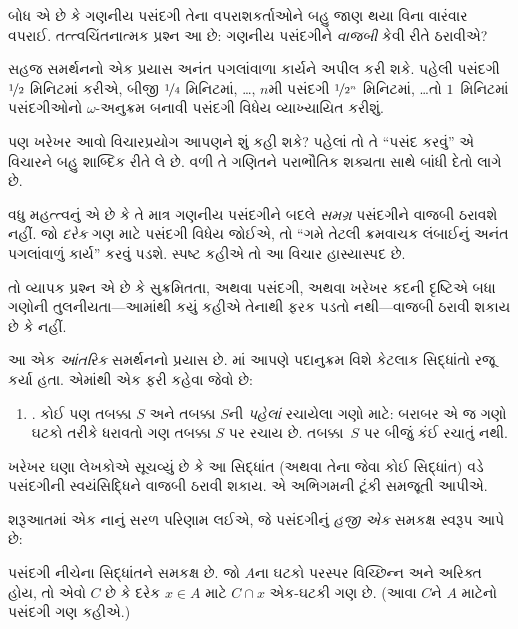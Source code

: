 બોધ એ છે કે ગણનીય પસંદગી તેના
વપરાશકર્તાઓને બહુ જાણ થયા વિના
વારંવાર વપરાઈ. તત્ત્વચિંતનાત્મક પ્રશ્ન
આ છે: ગણનીય પસંદગીને \emph{વાજબી}
કેવી રીતે ઠરાવીએ?

સહજ સમર્થનનો એક પ્રયાસ અનંત પગલાંવાળા
કાર્યને અપીલ કરી શકે. પહેલી પસંદગી
$\nicefrac{1}{2}$ મિનિટમાં કરીએ, બીજી
$\nicefrac{1}{4}$ મિનિટમાં, \dots,
$n$મી પસંદગી $\nicefrac{1}{2^n}$
મિનિટમાં, \dots\@ તો $1$~મિનિટમાં
પસંદગીઓનો $\omega$-અનુક્રમ બનાવી
પસંદગી વિધેય વ્યાખ્યાયિત કરીશું.

પણ ખરેખર આવો વિચારપ્રયોગ આપણને
શું કહી શકે? પહેલાં તો તે ``પસંદ કરવું''
એ વિચારને બહુ શાબ્દિક રીતે લે છે.
વળી તે ગણિતને પરાભૌતિક શક્યતા
સાથે બાંધી દેતો લાગે છે.

વધુ મહત્ત્વનું એ છે કે તે માત્ર
ગણનીય પસંદગીને બદલે \emph{સમગ્ર}
પસંદગીને વાજબી ઠરાવશે નહીં. જો
\emph{દરેક} ગણ માટે પસંદગી વિધેય
જોઈએ, તો ``ગમે તેટલી ક્રમવાચક
લંબાઈનું અનંત પગલાંવાળું કાર્ય''
કરવું પડશે. સ્પષ્ટ કહીએ તો આ
વિચાર હાસ્યાસ્પદ છે.
\endgroup

\begingroup
\makeatletter{}\makeatother

\label{guunit:OLP-0598}


તો વ્યાપક પ્રશ્ન એ છે કે સુક્રમિતતા,
અથવા પસંદગી, અથવા ખરેખર કદની દૃષ્ટિએ
બધા ગણોની તુલનીયતા---આમાંથી કયું
કહીએ તેનાથી ફરક પડતો નથી---વાજબી
ઠરાવી શકાય છે કે નહીં.

આ એક \emph{આંતરિક} સમર્થનનો પ્રયાસ છે.
માં આપણે પદાનુક્રમ
વિશે કેટલાક સિદ્ધાંતો રજૂ કર્યા હતા.
એમાંથી એક ફરી કહેવા જેવો છે:
\begin{enumerate}
	\item[] \stagesacc. કોઈ પણ તબક્કા $S$
	અને તબક્કા $S$ની \emph{પહેલાં} રચાયેલા
	ગણો માટે: બરાબર એ જ ગણો ઘટકો
	તરીકે ધરાવતો ગણ તબક્કા $S$ પર
	રચાય છે. તબક્કા~$S$ પર બીજું કંઈ
	રચાતું નથી.
\end{enumerate}
ખરેખર ઘણા લેખકોએ સૂચવ્યું છે કે
આ સિદ્ધાંત (અથવા તેના જેવા કોઈ
સિદ્ધાંત) વડે પસંદગીની સ્વયંસિદ્ધિને
વાજબી ઠરાવી શકાય. એ અભિગમની
ટૂંકી સમજૂતી આપીએ.

શરૂઆતમાં એક નાનું સરળ પરિણામ લઈએ,
જે પસંદગીનું \emph{હજી એક} સમકક્ષ
સ્વરૂપ આપે છે:

\begin{thm}[$\ZF$માં]
પસંદગી નીચેના સિદ્ધાંતને સમકક્ષ છે.
જો $A$ના ઘટકો પરસ્પર
વિચ્છિન્ન અને અરિક્ત હોય, તો એવો
$C$ છે કે દરેક $x \in A$ માટે
$C \cap x$ એક-ઘટકી ગણ છે.
(આવા $C$ને $A$ માટેનો
{પસંદગી ગણ} કહીએ.)
\end{thm}

